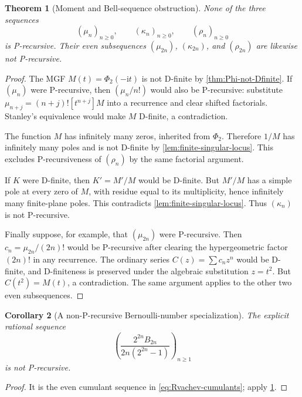 \documentclass[11pt]{article}
\numberwithin{equation}{section}
\newtheorem{theorem}{Theorem}[section]
\newtheorem{corollary}[theorem]{Corollary}
\theoremstyle{definition}
\theoremstyle{remark}
\newcommand{\ii}{\mathrm i}
\begin{document}
\begin{theorem}[Moment and Bell-sequence obstruction]
\label{thm:moment-not-P-recursive}
None of the three sequences
\begin{equation}
 (\mu_n)_{n\ge0},\qquad
 (\kappa_n)_{n\ge0},\qquad
 (\rho_n)_{n\ge0}
 \label{eq:three-sequences}
\end{equation}
is P-recursive.  Their even subsequences
$(\mu_{2n})$, $(\kappa_{2n})$, and $(\rho_{2n})$ are likewise not
P-recursive.
\end{theorem}
\begin{proof}
The MGF $M(t)=\Phi_2(-\ii t)$ is not D-finite by
\cref{thm:Phi-not-Dfinite}.  If $(\mu_n)$ were P-recursive, then
$(\mu_n/n!)$ would also be P-recursive: substitute
$\mu_{n+j}=(n+j)![t^{n+j}]M$ into a recurrence and clear shifted factorials.
Stanley's equivalence would make $M$ D-finite, a contradiction.

The function $M$ has infinitely many zeros, inherited from $\Phi_2$.
Therefore $1/M$ has infinitely many poles and is not D-finite by
\cref{lem:finite-singular-locus}.  This excludes P-recursiveness of
$(\rho_n)$ by the same factorial argument.

If $K$ were D-finite, then $K'=M'/M$ would be D-finite.  But $M'/M$ has a
simple pole at every zero of $M$, with residue equal to its multiplicity, hence
infinitely many finite-plane poles.  This contradicts
\cref{lem:finite-singular-locus}.  Thus $(\kappa_n)$ is not P-recursive.

Finally suppose, for example, that $(\mu_{2n})$ were P-recursive.  Then
$c_n=\mu_{2n}/(2n)!$ would be P-recursive after clearing the hypergeometric
factor $(2n)!$ in any recurrence.  The ordinary series
$C(z)=\sum c_nz^n$ would be D-finite, and D-finiteness is preserved under the
algebraic substitution $z=t^2$.  But $C(t^2)=M(t)$, a contradiction.  The same
argument applies to the other two even subsequences.
\end{proof}

\begin{corollary}[A non-P-recursive Bernoulli-number specialization]
\label{cor:Bernoulli-specialization-nonP}
The explicit rational sequence
\begin{equation}
 \left(
 \frac{2^{2n}B_{2n}}{2n(2^{2n}-1)}
 \right)_{n\ge1}
 \label{eq:weighted-Bernoulli-sequence}
\end{equation}
is not P-recursive.
\end{corollary}
\begin{proof}
It is the even cumulant sequence in \eqref{eq:Rvachev-cumulants}; apply
\cref{thm:moment-not-P-recursive}.
\end{proof}
\end{document}
